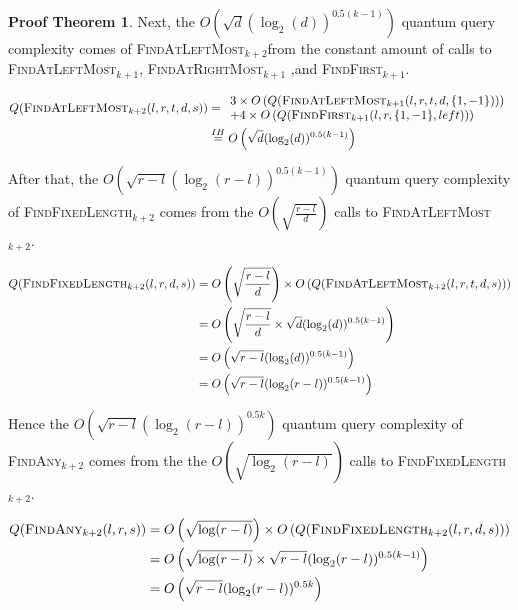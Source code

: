 \documentclass[11pt,a4paper]{article}
\newcommand{\FA}[1]{\textsc{FindAny$_{#1}$}}
\newcommand{\FFL}[1]{\textsc{FindFixedLength$_{#1}$}}
\newcommand{\FALM}[1]{\textsc{FindAtLeftMost$_{#1}$}}
\newcommand{\FARM}[1]{\textsc{FindAtRightMost$_{#1}$}}
\newcommand{\FF}[1]{\textsc{FindFirst$_{#1}$}}
\theoremstyle{definition}
\theoremstyle{plain}
\theoremstyle{definition}
\newtheorem{tproof}{Proof Theorem}[section]
\begin{document}
\begin{appendix}
\begin{tproof}
{            Next, the $ O\left(\sqrt{d}(\log_2(d))^{0.5(k-1)} \right)$ quantum query complexity comes of \FALM{k+2}from the constant amount
            of calls to \FALM{k+1}, \FARM{k+1} ,and \FF{k+1}.

            \begin{align*}
                Q(\textrm{\FALM{k+2}}(l,r,t,d,s)) & = \begin{array}{l}
                    3 \times O\left(Q(\textrm{\FALM{k+1}}(l,r,t,d,\{1,-1\}))\right) \\
                    + 4 \times O\left(Q(\textrm{\FF{k+1}}(l,r,\{1,-1\},left))\right)
                \end{array}                                  \\
                                                  & \overset{IH}{=} O\left(\sqrt{d}(\log_2(d))^{0.5(k-1)} \right)
            \end{align*}

            After that, the $O\left( \sqrt{r-l}(\log_2(r-l))^{0.5(k-1)}\right)$ quantum query complexity of \FFL{k+2} comes from the
            $O\left(\sqrt{\frac{r-l}{d}}\right)$ calls to \FALM{k+2}.

            \begin{align*}
                Q(\textrm{\FFL{k+2}}(l, r, d, s)) & = O\left(\sqrt{\frac{r-l}{d}}\right) \times O\left(Q(\textrm{\FALM{k+2}}(l,r,t,d,s))\right) \\
                                                  & = O\left( \sqrt{\frac{r-l}{d}} \times \sqrt{d}(\log_2(d))^{0.5(k-1)}\right)                 \\
                                                  & = O\left( \sqrt{r-l}(\log_2(d))^{0.5(k-1)}\right)                                           \\
                                                  & = O\left( \sqrt{r-l}(\log_2(r-l))^{0.5(k-1)}\right)
            \end{align*}

            Hence the $O\left( \sqrt{r-l}(\log_2(r-l))^{0.5k} \right)$ quantum query complexity of \FA{k+2} comes from the
            the $O\left(\sqrt{\log_2(r-l)}\right)$ calls to \FFL{k+2}.

            \begin{align*}
                Q(\textrm{\FA{k+2}}(l, r, s)) & = O\left(\sqrt{\log(r-l)}\right) \times O\left(Q(\textrm{\FFL{k+2}}(l, r, d, s))\right) \\
                                              & = O\left( \sqrt{\log(r-l)} \times \sqrt{r-l}(\log_2(r-l))^{0.5(k-1)} \right)            \\
                                              & = O\left( \sqrt{r-l}(\log_2(r-l))^{0.5k} \right)                                        \\
            \end{align*}

}
\end{tproof}
\end{appendix}
\end{document}
